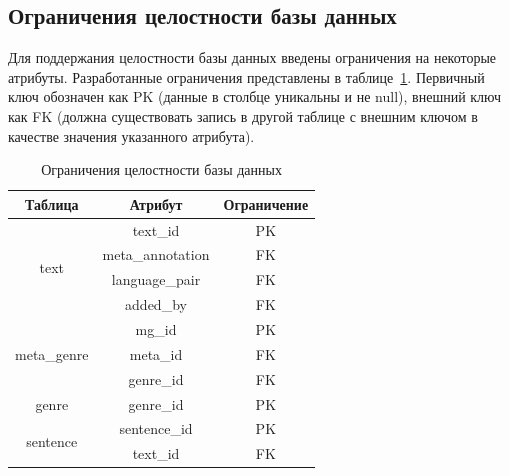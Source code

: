\subsection{Ограничения целостности базы данных}

Для поддержания целостности базы данных введены ограничения на некоторые атрибуты. Разработанные ограничения представлены в таблице~\ref{integrity}. Первичный ключ обозначен как PK (данные в столбце уникальны и не null), внешний ключ как FK (должна существовать запись в другой таблице с внешним ключом в качестве значения указанного атрибута).

\begin{table}[H]
	\caption{Ограничения целостности базы данных}\label{integrity}
	\begin{tabular}{|c|c|c|}
		\hline
		Таблица                           & Атрибут                                                               & Ограничение                \\ \hline
		\multirow{4}{*}{text}             & text\_id                                                              & PK                         \\ \cline{2-3} 
		& meta\_annotation                                                      & FK                         \\ \cline{2-3} 
		& language\_pair                                                       & FK                         \\ \cline{2-3} 
		& added\_by                                                             & FK                         \\ \hline
		\multirow{3}{*}{meta\_genre}      & mg\_id                                                                & PK                         \\ \cline{2-3} 
		& meta\_id                                                              & FK                         \\ \cline{2-3} 
		& genre\_id                                                             & FK                         \\ \hline
		genre                             & genre\_id                                                             & PK                         \\ \hline
		\multirow{2}{*}{sentence}         & sentence\_id                                                          & PK                         \\ \cline{2-3} 
		& text\_id                                                              & FK                         \\ \hline

\end{tabular}
\end{table}
